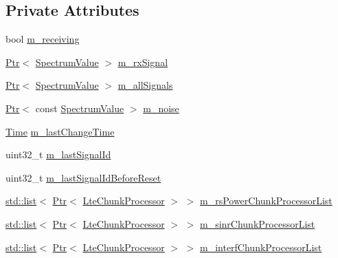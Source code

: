 \subsection*{Private Attributes}
\begin{DoxyCompactItemize}
\item 
bool \hyperlink{classns3_1_1LteInterference_a12580fdb6df9e6afa3fc4f3c68648bf3}{m\+\_\+receiving}
\item 
\hyperlink{classns3_1_1Ptr}{Ptr}$<$ \hyperlink{classns3_1_1SpectrumValue}{Spectrum\+Value} $>$ \hyperlink{classns3_1_1LteInterference_a110c40dd295d66897ca93e4bcc947dfa}{m\+\_\+rx\+Signal}
\item 
\hyperlink{classns3_1_1Ptr}{Ptr}$<$ \hyperlink{classns3_1_1SpectrumValue}{Spectrum\+Value} $>$ \hyperlink{classns3_1_1LteInterference_a40f11c0e16be1fe4ee232f5c4620c24e}{m\+\_\+all\+Signals}
\item 
\hyperlink{classns3_1_1Ptr}{Ptr}$<$ const \hyperlink{classns3_1_1SpectrumValue}{Spectrum\+Value} $>$ \hyperlink{classns3_1_1LteInterference_a9d4450468cc82d258490f44f487d2fb4}{m\+\_\+noise}
\item 
\hyperlink{classns3_1_1Time}{Time} \hyperlink{classns3_1_1LteInterference_ab694cd3b025f150e39b071e0f3d294a7}{m\+\_\+last\+Change\+Time}
\item 
uint32\+\_\+t \hyperlink{classns3_1_1LteInterference_acc72a7fdc9bf2fa8389eae7286aa5362}{m\+\_\+last\+Signal\+Id}
\item 
uint32\+\_\+t \hyperlink{classns3_1_1LteInterference_a462e2bdb7a6db3f5e1718ac216fe45c1}{m\+\_\+last\+Signal\+Id\+Before\+Reset}
\item 
\hyperlink{openflow-interface_8h_afd9bcfa176617760671b67580f536fa7}{std\+::list}$<$ \hyperlink{classns3_1_1Ptr}{Ptr}$<$ \hyperlink{classns3_1_1LteChunkProcessor}{Lte\+Chunk\+Processor} $>$ $>$ \hyperlink{classns3_1_1LteInterference_a4b261932ab7620cf1303dfbf4cdba6b5}{m\+\_\+rs\+Power\+Chunk\+Processor\+List}
\item 
\hyperlink{openflow-interface_8h_afd9bcfa176617760671b67580f536fa7}{std\+::list}$<$ \hyperlink{classns3_1_1Ptr}{Ptr}$<$ \hyperlink{classns3_1_1LteChunkProcessor}{Lte\+Chunk\+Processor} $>$ $>$ \hyperlink{classns3_1_1LteInterference_ad2b739da02cfdfd8cb49fd34a5d95b7d}{m\+\_\+sinr\+Chunk\+Processor\+List}
\item 
\hyperlink{openflow-interface_8h_afd9bcfa176617760671b67580f536fa7}{std\+::list}$<$ \hyperlink{classns3_1_1Ptr}{Ptr}$<$ \hyperlink{classns3_1_1LteChunkProcessor}{Lte\+Chunk\+Processor} $>$ $>$ \hyperlink{classns3_1_1LteInterference_abd2337c56d85ec7775f6ae1e7c2036cc}{m\+\_\+interf\+Chunk\+Processor\+List}
\end{DoxyCompactItemize}
